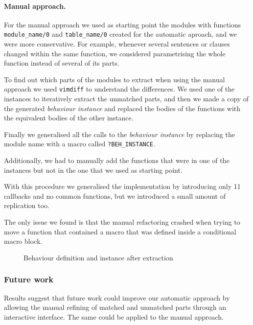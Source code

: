 \paragraph{Manual approach.}

For the manual approach we used as starting point the modules with functions 
\texttt{module\_name/0} and \texttt{table\_name/0} created for the automatic 
aproach, and we were more conservative. For example, whenever several sentences 
or clauses changed within the same function, we considered parametrising the 
whole function instead of several of its parts.

To find out which parts of the modules to extract when using the manual 
approach we used \texttt{vimdiff} to understand the differences. We used one of 
the instances to iteratively extract the unmatched parts, and then we made a 
copy of the generated \emph{behaviour instance} and replaced the bodies of the 
functions with the equivalent bodies of the other instance.

Finally we generalised all the calls to the \emph{behaviour instance} by 
replacing the module name with a macro called \texttt{?BEH\_INSTANCE}.

Additionally, we had to manually add the functions that were in one of the 
instances but not in the one that we used as starting point.

With this procedure we generalised the implementation by introducing only 11 
callbacks and no common functions, but we introduced a small amount of 
replication too.

The only issue we found is that the manual refactoring crashed when trying to 
move a function that contained a macro that was defined inside a conditional 
macro block.

\begin{figure}[t]
%
\vspace*{-2.5mm}
\caption{Behaviour definition and instance after extraction\label{fig:auto-abs}}
\end{figure}

\subsubsection{Future work}

Results suggest that future work could improve our automatic approach by 
allowing the manual refining of matched and unmatched parts through an 
interactive interface. The same could be applied to the manual approach.

